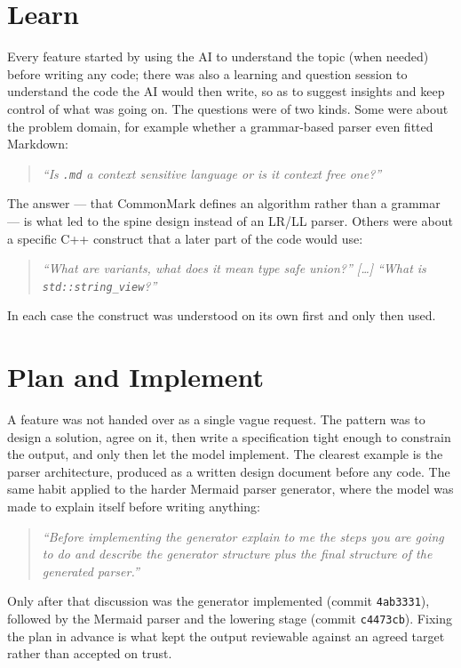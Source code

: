 \documentclass[12pt]{report}
\begin{document}
\section{Learn}

Every feature started by using the AI to understand the topic (when needed) before writing any code; there was also a learning and question session to understand the code the AI would then write, so as to suggest insights and keep control of what was going on. The questions were of two kinds. Some were about the problem domain, for example whether a grammar-based parser even fitted Markdown:
\begin{quote}\itshape ``Is \verb|.md| a context sensitive language or is it context free one?''\end{quote}
The answer --- that CommonMark defines an algorithm rather than a grammar --- is what led to the spine design instead of an LR/LL parser. Others were about a specific C++ construct that a later part of the code would use:
\begin{quote}\itshape ``What are variants, what does it mean type safe union?'' [\ldots] ``What is \verb|std::string_view|?''\end{quote}
In each case the construct was understood on its own first and only then used.

\section{Plan and Implement}

A feature was not handed over as a single vague request. The pattern was to design a solution, agree on it, then write a specification tight enough to constrain the output, and only then let the model implement. The clearest example is the parser architecture, produced as a written design document before any code. The same habit applied to the harder Mermaid parser generator, where the model was made to explain itself before writing anything:
\begin{quote}\itshape ``Before implementing the generator explain to me the steps you are going to do and describe the generator structure plus the final structure of the generated parser.''\end{quote}
Only after that discussion was the generator implemented (commit \verb|4ab3331|), followed by the Mermaid parser and the lowering stage (commit \verb|c4473cb|). Fixing the plan in advance is what kept the output reviewable against an agreed target rather than accepted on trust.
\end{document}
